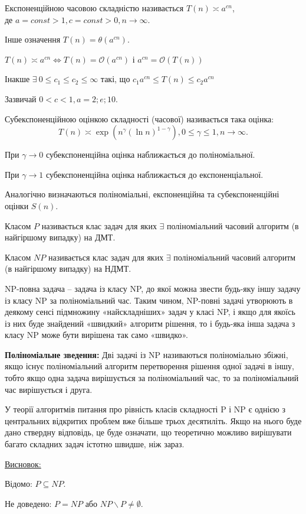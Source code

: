  \begin{mydef}Експоненційною часовою складністю називається $T(n) \asymp a^{cn}$, \\ 
 де $a = const > 1, c = const > 0, n \to \infty$. \end{mydef}

Інше означення $T(n) = \theta (a^{cn}).$

 $T(n) \asymp a^{cn} \Longleftrightarrow  T(n) = \mathcal O (a^{cn})$ і $ a^{cn} = \mathcal O(T(n))$

Інакше $\exists \: 0 \le c_1 \le c_2 \le \infty$ такі, що $c_1a^{cn}\leq T(n) \leq c_2a^{cn}$

Зазвичай  $0 < c < 1, a = 2; e; 10.$ 

 \begin{mydef} Субекспоненційною оцінкою складності (часової) називається така оцінка: 
 \[
 T(n) \asymp \exp (n^\gamma (\ln n)^{1-\gamma}),  0\leq \gamma \leq 1, n \to \infty.
 \]
\end{mydef}

При $\gamma \to 0$ субекспоненційна оцінка наближається до поліноміальної.

При $\gamma \to 1$ субекспоненційна оцінка наближається до експоненціальної.

Аналогічно визначаються поліноміальні, експоненційна та субекспоненційні оцінки $S(n)$.

 \begin{mydef}Класом $P$ називається клас задач для яких $\exists$ поліноміальний часовий алгоритм (в найгіршому випадку) на ДМТ. \end{mydef}

 \begin{mydef}Класом $NP$ називається клас задач для яких $\exists$ поліноміальний часовий алгоритм (в найгіршому випадку) на НДМТ. \end{mydef}

NP-повна задача -- задача із класу NP, до якої можна звести будь-яку іншу задачу із класу NP за поліноміальний час. Таким чином, NP-повні задачі утворюють в деякому сенсі підмножину «найскладніших» задач у класі NP, і якщо для якоїсь із них буде знайдений «швидкий» алгоритм рішення, то і будь-яка інша задача з класу NP може бути вирішена так само «швидко». \\ \par

\textbf{Поліноміальне зведення:}
Дві задачі із NP називаються поліноміально збіжні, якщо існує поліноміальний
алгоритм перетворення рішення одної задачі в іншу, тобто якщо одна задача вирішується за поліноміальний час, то за поліноміальний час вирішується і друга. \par
У теорії алгоритмів питання про рівність класів складності P і NP є однією з
центральних відкритих проблем вже більше трьох десятиліть. Якщо на нього буде дано ствердну відповідь, це буде означати, що теоретично можливо вирішувати багато складних задач істотно швидше, ніж зараз.\\  \par

\underline{Висновок:} \par 

Відомо: $P \subseteq NP.$

Не доведено: $ P = NP$ або $NP \backslash P \ne \emptyset$.